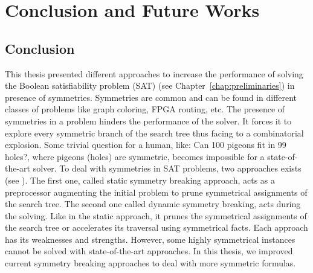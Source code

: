 \chapter{Conclusion and Future Works}\label{chap:conclu}

\section{Conclusion}
This thesis presented different approaches to increase the performance of solving 
the Boolean satisfiability problem (SAT) (see Chapter~\ref{chap:preliminaries}) in presence of symmetries. 
Symmetries are common and  can be found in different classes of problems like
graph coloring, FPGA routing, etc.
The presence of symmetries in a problem hinders the performance of the solver. It forces
it to explore every symmetric branch of the search tree thus facing to a combinatorial explosion.
Some trivial question for a human, like: Can 100 pigeons fit in 99 holes?,
where pigeons (holes) are symmetric, becomes impossible for a state-of-the-art solver. 
To deal with symmetries in SAT problems, two approaches exists (see ).
The first one, called static symmetry breaking approach, acts as a preprocessor augmenting the initial
problem to prune symmetrical assignments of the search tree. The second one called dynamic symmetry breaking,
acts during the solving. Like in the static approach, it prunes the symmetrical assignments of the 
search tree or accelerates its traversal using symmetrical facts.
Each approach has its weaknesses and strengths. However, some highly symmetrical instances cannot be solved with
state-of-the-art approaches. In this thesis, we improved current symmetry breaking approaches to 
deal with more symmetric formulas.

